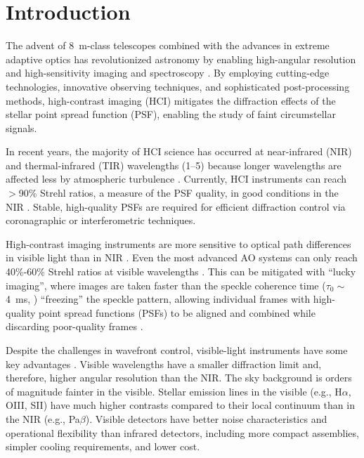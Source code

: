\section{Introduction}\label{sec:intro}

The advent of \SI{8}{\meter}-class telescopes combined with the advances in extreme adaptive optics has revolutionized astronomy by enabling high-angular resolution and high-sensitivity imaging and spectroscopy \citep{guyon_extreme_2018,currie_direct_2023,galicher_imaging_2024}. By employing cutting-edge technologies, innovative observing techniques, and sophisticated post-processing methods, high-contrast imaging (HCI) mitigates the diffraction effects of the stellar point spread function (PSF), enabling the study of faint circumstellar signals.

In recent years, the majority of HCI science has occurred at near-infrared (NIR) and thermal-infrared (TIR) wavelengths (\SIrange{1}{5}{\micron}) because longer wavelengths are affected less by atmospheric turbulence \citep{fried_optical_1966,roddier_effects_1981}. Currently, HCI instruments can reach $>$90\% Strehl ratios, a measure of the PSF quality, in good conditions in the NIR \citep{beuzit_sphere_2019,lozi_status_2020}. Stable, high-quality PSFs are required for efficient diffraction control via coronagraphic or interferometric techniques.

High-contrast imaging instruments are more sensitive to optical path differences in visible light than in NIR \citep{fried_optical_1966,roddier_effects_1981}. Even the most advanced AO systems can only reach 40\%-60\% Strehl ratios at visible wavelengths \citep{ahn_scexao_2021,males_magao-x_2022}. This can be mitigated with ``lucky imaging'', where images are taken faster than the speckle coherence time ($\tau_0 \sim$\SI{4}{\milli\second}, \citealp{kooten_climate_2022}) ``freezing'' the speckle pattern, allowing individual frames with high-quality point spread functions (PSFs) to be aligned and combined while discarding poor-quality frames \citep{law_lucky_2006, garrel_highly_2012, lang_tractor_2016}.

Despite the challenges in wavefront control, visible-light instruments have some key advantages \citep{close_into_2014}.  Visible wavelengths have a smaller diffraction limit and, therefore, higher angular resolution than the NIR. The sky background is orders of magnitude fainter in the visible. Stellar emission lines in the visible (e.g., H$\alpha$, OIII, SII) have much higher contrasts compared to their local continuum than in the NIR (e.g., Pa$\beta$). Visible detectors have better noise characteristics and operational flexibility than infrared detectors, including more compact assemblies, simpler cooling requirements, and lower cost.

